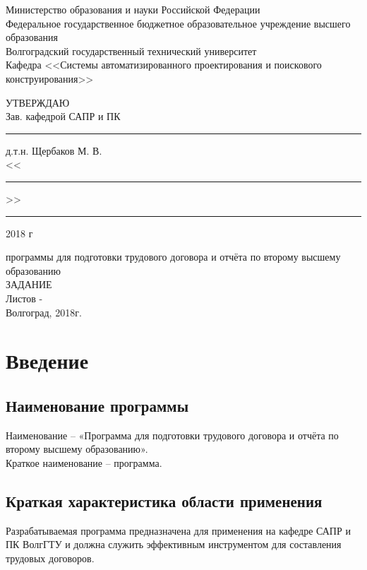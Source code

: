 \documentclass[14pt]{extarticle}
\begin{document}
\begin{center}

    Министерство образования и науки Российской Федерации\\
    Федеральное государственное бюджетное образовательное учреждение высшего образования\\
    Волгоградский государственный технический университет\\
    Кафедра <<Системы автоматизированного проектирования и поискового конструирования>>
\end{center}
\vspace{70pt}
\begin{flushright}

    УТВЕРЖДАЮ\\
    Зав. кафедрой САПР и ПК\\
    \rule{25mm}{0.4pt} д.т.н. Щербаков М. В.\\
    <<\rule{7mm}{0.4pt}>> \rule{35mm}{0.4pt} 2018 г
\end{flushright}

\begin{center}
     программы для подготовки трудового договора и отчёта по второму высшему образованию\\
    \vspace{30pt}
     ЗАДАНИЕ\\
    Листов - \pageref{LastPage}\\
    \vspace*{\fill}
    Волгоград, 2018г.\\
\end{center}

\newpage
 
\tableofcontents
\newpage

\section{Введение}
    \subsection{Наименование программы}
    Наименование – «Программа для подготовки трудового договора и отчёта по второму высшему образованию». \\Краткое наименование – программа.
    \subsection{Краткая характеристика области применения}
    Разрабатываемая программа предназначена для применения на кафедре САПР и ПК ВолгГТУ и должна служить эффективным инструментом для составления трудовых договоров.
 
\end{document}
